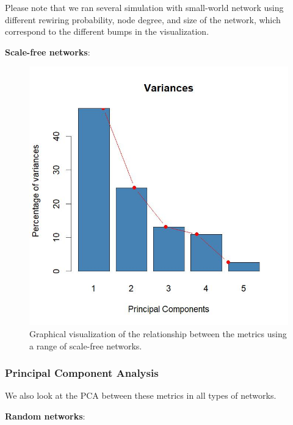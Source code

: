 \documentclass[
]{article}
\begin{document}
Please note that we ran several simulation with small-world network
using different rewiring probability, node degree, and size of the
network, which correspond to the different bumps in the visualization.

\textbf{Scale-free networks}:

\begin{figure}[!H]

{\centering \includegraphics{./Figures/unnamed-chunk-82-1} 

}

\caption{Graphical visualization of the relationship between the metrics using a range of scale-free networks.}\label{fig:unnamed-chunk-82}
\end{figure}

\hypertarget{principal-component-analysis}{%
\subsubsection{Principal Component
Analysis}\label{principal-component-analysis}}

We also look at the PCA between these metrics in all types of networks.

\textbf{Random networks}:
\end{document}
